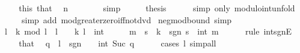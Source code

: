 \begin{isabellebody}
\ \ \isamarkupfalse%
\ \isamarkupfalse%
\ this\ that\ \isamarkupfalse%
\ {\isachardoublequoteopen}n\ {\isachargreater}{\kern0pt}\ {}{\isachardoublequoteclose}\isanewline
\ \ \ \ \isamarkupfalse%
\ simp\isanewline
\ \ \isamarkupfalse%
\ \isamarkupfalse%
\ {\isacharquery}{\kern0pt}thesis\isanewline
\ \ \ \ \isamarkupfalse%
\ {\isacharparenleft}{\kern0pt}simp\ only{\isacharcolon}{\kern0pt}\ modulo{\isacharunderscore}{\kern0pt}int{\isacharunderscore}{\kern0pt}unfold{\isacharparenright}{\kern0pt}\isanewline
\ \ \ \ \ \ {\isacharparenleft}{\kern0pt}simp\ add{\isacharcolon}{\kern0pt}\ mod{\isacharunderscore}{\kern0pt}greater{\isacharunderscore}{\kern0pt}zero{\isacharunderscore}{\kern0pt}iff{\isacharunderscore}{\kern0pt}not{\isacharunderscore}{\kern0pt}dvd{\isacharparenright}{\kern0pt}\isanewline
{}\isamarkupfalse%
%
\endisatagproof
{\isafoldproof}%
%
\isadelimproof
\isanewline
%
\endisadelimproof
\isanewline
{}\isamarkupfalse%
\ neg{\isacharunderscore}{\kern0pt}mod{\isacharunderscore}{\kern0pt}bound\ {\isacharbrackleft}{\kern0pt}simp{\isacharbrackright}{\kern0pt}{\isacharcolon}{\kern0pt}\isanewline
\ \ {\isachardoublequoteopen}l\ {\isacharless}{\kern0pt}\ k\ mod\ l{\isachardoublequoteclose}\ \ {\isachardoublequoteopen}l\ {\isacharless}{\kern0pt}\ {}{\isachardoublequoteclose}\ \ k\ l\ {\isacharcolon}{\kern0pt}{\isacharcolon}{\kern0pt}\ int\isanewline
%
\isadelimproof
%
\endisadelimproof
%
\isatagproof
{}\isamarkupfalse%
\ {\isacharminus}{\kern0pt}\isanewline
\ \ \isamarkupfalse%
\ m\ \ s\ \ {\isachardoublequoteopen}k\ {\isacharequal}{\kern0pt}\ sgn\ s\ {\isacharasterisk}{\kern0pt}\ int\ m{\isachardoublequoteclose}\isanewline
\ \ \ \ \isamarkupfalse%
\ {\isacharparenleft}{\kern0pt}rule\ int{\isacharunderscore}{\kern0pt}sgnE{\isacharparenright}{\kern0pt}\isanewline
\ \ \isamarkupfalse%
\ \isamarkupfalse%
\ that\ \isamarkupfalse%
\ q\ \ {\isachardoublequoteopen}l\ {\isacharequal}{\kern0pt}\ sgn\ {\isacharparenleft}{\kern0pt}{\isacharminus}{\kern0pt}\ {}{\isacharparenright}{\kern0pt}\ {\isacharasterisk}{\kern0pt}\ int\ {\isacharparenleft}{\kern0pt}Suc\ q{\isacharparenright}{\kern0pt}{\isachardoublequoteclose}\isanewline
\ \ \ \ \isamarkupfalse%
\ {\isacharparenleft}{\kern0pt}cases\ l{\isacharparenright}{\kern0pt}\ simp{\isacharunderscore}{\kern0pt}all\isanewline

\end{isabellebody}
